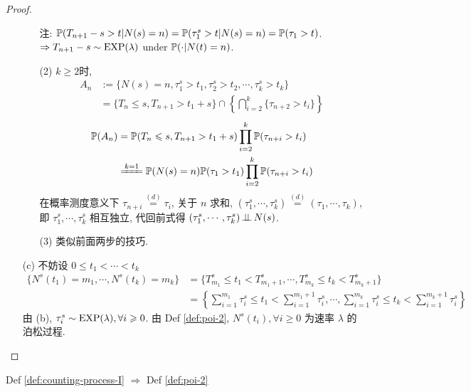 \begin{proof}
\begin{enumerate}
\begin{enumerate}
        注: $\mathbb{P}(T_{n+1}-s>t|N(s)=n)=\mathbb{P}(\tau_1^s>t|N(s)=n)=\mathbb{P}(\tau_1>t)$. $\Rightarrow T_{n+1}-s\sim \operatorname{EXP}(\lambda)$ under $\mathbb{P}(\cdot|N(t)=n)$.
        \item[(2)] $k\geq 2$时, 
        \[
        \begin{aligned}
            A_n &:=\{N(s)=n,\tau_1^s>t_1,\tau_2^s>t_2,\cdots, \tau_k^s>t_k\}\\
            &=\{T_n\leq s,T_{n+1}>t_1+s\}\cap \left\{\bigcap_{i=2}^k \{\tau_{n+2}>t_i\}\right\}
        \end{aligned}
        \]
        \[
        \begin{aligned}
            \PP(A_n) &=\PP(T_n\leq s, T_{n+1}>t_1+s)\prod_{i=2}^k \PP(\tau_{n+i}>t_i)\\
            &\xlongequal{k=1}\PP(N(s)=n)\PP(\tau_1>t_1)\prod_{i=2}^k\PP(\tau_{n+i}>t_i)
        \end{aligned}
        \]
        在概率测度意义下 $\tau_{n+i}\overset{(d)}{=}\tau_i$, 关于 $n$ 求和, $(\tau_1^s,\cdots,\tau_k^s)\overset{(d)}{=}(\tau_1,\cdots,\tau_k)$, 即 $\tau_1^s,\cdots,\tau_k^s$ 相互独立, 代回前式得 $(\tau_1^s,\cdots,\tau_k^s)\operatorname{\perp\!\!\!\perp} N(s)$.
        \item[(3)] 类似前面两步的技巧.
    \end{enumerate}
    \item[(c)] 不妨设 $0\leq t_1<\cdots<t_k$
    \[
    \begin{aligned}
        \{N^s(t_1)=m_1,\cdots,N^s(t_k)=m_k\} &=\{T_{m_1}^s\leq t_1< T_{m_1+1}^s,\cdots,T_{m_k}^s\leq t_k< T_{m_k+1}^s\}\\
        &=\left\{\sum_{i=1}^{m_1}\tau_i^s\leq t_1<\sum_{i=1}^{m_1+1}\tau_i^s,\cdots,\sum_{i=1}^{m_k}\tau_i^s\leq t_k<\sum_{i=1}^{m_k+1}\tau_i^s\right\}
    \end{aligned}
    \]
    由 (b), $\tau_i^s\sim \operatorname{EXP}(\lambda),\forall i\geqslant 0$. 由 Def \ref{def:poi-2}, $N^s(t_i),\forall i\geq 0$ 为速率 $\lambda$ 的泊松过程. 
\end{enumerate}
\end{proof}

\begin{proposition}
    Def \ref{def:counting-process-I} $\Rightarrow$ Def \ref{def:poi-2}
\end{proposition}

